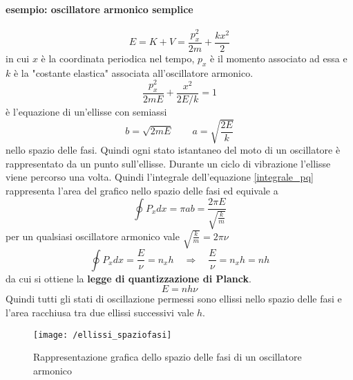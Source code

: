 \paragraph{esempio: oscillatore armonico semplice}
\begin{equation}
E = K + V = \frac{ p_x^2}{2m } + \frac{ k x^2}{2 }
\end{equation}
in cui $x$ è la coordinata periodica nel tempo, $p_x$ è il momento associato ad essa e $k$ è la "costante elastica" associata all'oscillatore armonico.
\begin{equation}
\frac{ p_x^2}{2mE } + \frac{ x^2}{2E / k } = 1
\end{equation}
è l'equazione di un'ellisse con semiassi
\begin{equation}
b = \sqrt{2mE} \quad\quad a = \sqrt{\frac{ 2E}{k }}
\end{equation}
nello spazio delle fasi.
Quindi ogni stato istantaneo del moto di un oscillatore è rappresentato da un punto sull'ellisse.
Durante un ciclo di vibrazione l'ellisse viene percorso una volta.
Quindi l'integrale dell'equazione \ref{integrale_pq} rappresenta l'area del grafico nello spazio delle fasi ed equivale a
\begin{equation}
\oint P_x dx 
= \pi a b
= \frac{ 2\pi E}{\sqrt{\frac{ k}{m }} }
\end{equation}
per un qualsiasi oscillatore armonico vale $\sqrt{\frac{ k}{m }} = 2\pi\nu$
\begin{equation}
\oint P_x dx = \frac{ E}{\nu }= n_x h 
\quad\Rightarrow\quad
\frac{ E}{\nu } = n_x h = n h
\end{equation}
da cui si ottiene la \textbf{legge di quantizzazione di Planck}.
\begin{equation}
E = n h \nu
\label{quant_planck}
\end{equation}
Quindi tutti gli stati di oscillazione permessi sono ellissi nello spazio delle fasi e l'area racchiusa tra due ellissi successivi vale $h$.
\begin{figure}[h]
\centering
\texttt{[image: /ellissi\_spaziofasi]}
\caption{Rappresentazione grafica dello spazio delle fasi di un oscillatore armonico}
\end{figure}

